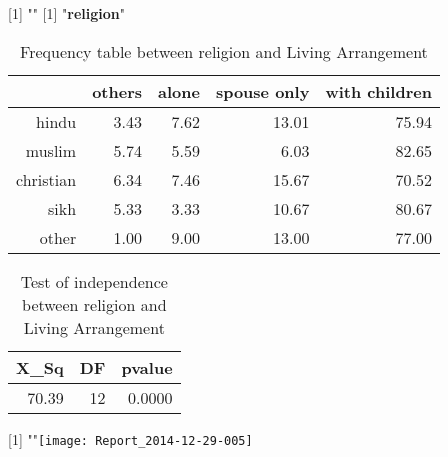 \documentclass[11pt]{article}
\begin{document}
[1] "\newline"
[1] "{\bf{religion}}"
\begin{table}[H]
\centering
\begin{tabular}{rrrrr}
  \hline
 & others & alone & spouse only & with children \\ 
  \hline
hindu & 3.43 & 7.62 & 13.01 & 75.94 \\ 
  muslim & 5.74 & 5.59 & 6.03 & 82.65 \\ 
  christian & 6.34 & 7.46 & 15.67 & 70.52 \\ 
  sikh & 5.33 & 3.33 & 10.67 & 80.67 \\ 
  other & 1.00 & 9.00 & 13.00 & 77.00 \\ 
   \hline
\end{tabular}
\caption{Frequency table between religion and Living Arrangement} 
\end{table}
\begin{table}[H]
\centering
\begin{tabular}{rrr}
  \hline
X\_Sq & DF & pvalue \\ 
  \hline
70.39 & 12 & 0.0000 \\ 
   \hline
\end{tabular}
\caption{Test of independence between religion and Living Arrangement} 
\end{table}
[1] "\newline"\texttt{[image: Report\_2014-12-29-005]}
\end{document}
